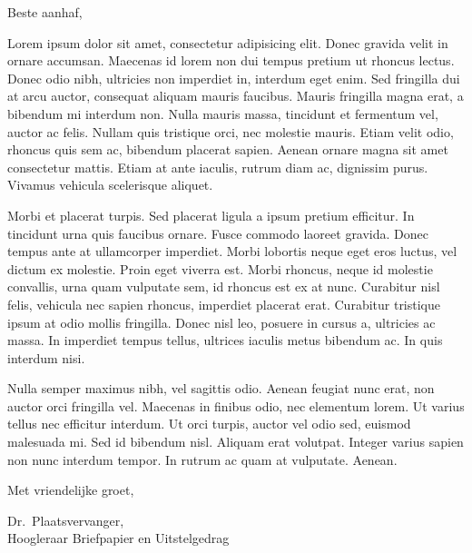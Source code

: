 \documentclass[11pt]{letter}
\date{January 1, 1970}
\begin{document}
\begin{letterhead}

Beste aanhaf,

Lorem ipsum dolor sit amet, consectetur adipisicing elit. Donec gravida velit in ornare accumsan. Maecenas id lorem non dui tempus pretium ut rhoncus lectus. Donec odio nibh, ultricies non imperdiet in, interdum eget enim. Sed fringilla dui at arcu auctor, consequat aliquam mauris faucibus. Mauris fringilla magna erat, a bibendum mi interdum non. Nulla mauris massa, tincidunt et fermentum vel, auctor ac felis. Nullam quis tristique orci, nec molestie mauris. Etiam velit odio, rhoncus quis sem ac, bibendum placerat sapien. Aenean ornare magna sit amet consectetur mattis. Etiam at ante iaculis, rutrum diam ac, dignissim purus. Vivamus vehicula scelerisque aliquet.

Morbi et placerat turpis. Sed placerat ligula a ipsum pretium efficitur. In tincidunt urna quis faucibus ornare. Fusce commodo laoreet gravida. Donec tempus ante at ullamcorper imperdiet. Morbi lobortis neque eget eros luctus, vel dictum ex molestie. Proin eget viverra est. Morbi rhoncus, neque id molestie convallis, urna quam vulputate sem, id rhoncus est ex at nunc. Curabitur nisl felis, vehicula nec sapien rhoncus, imperdiet placerat erat. Curabitur tristique ipsum at odio mollis fringilla. Donec nisl leo, posuere in cursus a, ultricies ac massa. In imperdiet tempus tellus, ultrices iaculis metus bibendum ac. In quis interdum nisi.

Nulla semper maximus nibh, vel sagittis odio. Aenean feugiat nunc erat, non auctor orci fringilla vel. Maecenas in finibus odio, nec elementum lorem. Ut varius tellus nec efficitur interdum. Ut orci turpis, auctor vel odio sed, euismod malesuada mi. Sed id bibendum nisl. Aliquam erat volutpat. Integer varius sapien non nunc interdum tempor. In rutrum ac quam at vulputate. Aenean.

Met vriendelijke groet,

Dr.~Plaatsvervanger, \\
Hoogleraar Briefpapier en Uitstelgedrag

\end{letterhead}
\end{document}
